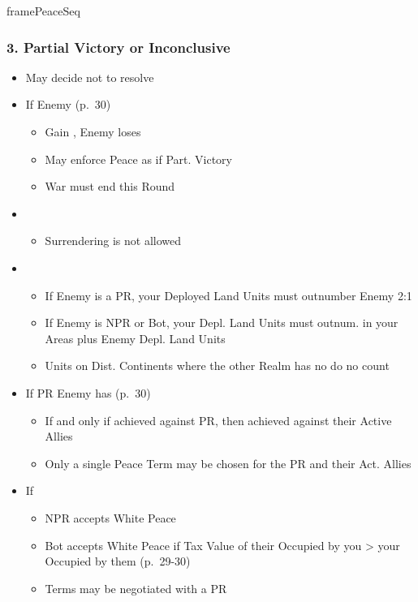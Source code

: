 \documentclass[10pt]{article}
\begin{document}
\begin{dynamiccontents*}{framePeaceSeq}
\begin{multicols}{2}
		\subsubsection*{3. Partial Victory or Inconclusive}
		\begin{itemize}
			\item May decide not to resolve
			\item If Enemy  (p.~30)
			\begin{itemize}
				\item Gain \p2, Enemy loses 
				\item May enforce Peace as if Part. Victory
				\item War must end this Round
			\end{itemize}
			\item {}
			\begin{itemize}
				\item Surrendering is not allowed
			\end{itemize}
			\item {}
			\begin{itemize}
				\item If Enemy is a PR, your Deployed Land Units must outnumber Enemy 2:1
				\item If Enemy is NPR or Bot, your Depl. Land Units must outnum. \rebels in your Areas plus Enemy Depl. Land Units
				\item Units on Dist. Continents where the other Realm has no \towns do no count
			\end{itemize}
			\item If PR Enemy has  (p.~30)
			\begin{itemize}
				\item If and only if achieved against PR, then achieved against their Active Allies
				\item Only a single Peace Term may be chosen for the PR and their Act. Allies
			\end{itemize}
			\item If 
			\begin{itemize}
				\item NPR accepts White Peace
				\item Bot accepts White Peace if Tax Value of their \towns Occupied by you > your \towns Occupied by them (p.~29-30)
				\item Terms may be negotiated with a PR
			\end{itemize}
		\end{itemize}


\end{multicols}
\end{dynamiccontents*}
\end{document}
